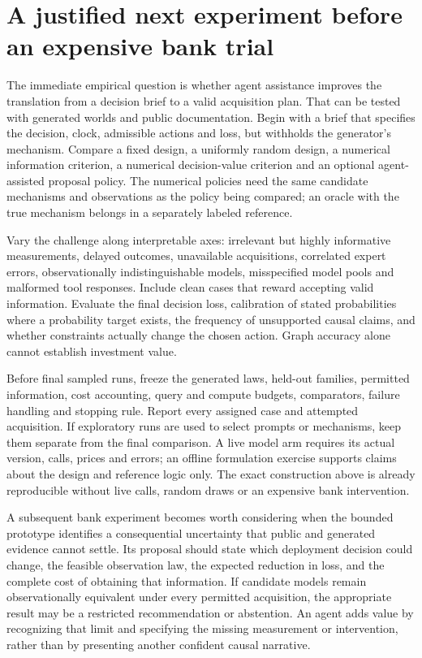 \section{A justified next experiment before an expensive bank trial}

The immediate empirical question is whether agent assistance improves the
translation from a decision brief to a valid acquisition plan. That can be
tested with generated worlds and public documentation. Begin with a brief
that specifies the decision, clock, admissible actions and loss, but withholds
the generator's mechanism. Compare a fixed design, a uniformly random design,
a numerical information criterion, a numerical decision-value criterion and
an optional agent-assisted proposal policy. The numerical policies need the
same candidate mechanisms and observations as the policy being compared; an
oracle with the true mechanism belongs in a separately labeled reference.

Vary the challenge along interpretable axes: irrelevant but highly informative
measurements, delayed outcomes, unavailable acquisitions, correlated expert
errors, observationally indistinguishable models, misspecified model pools
and malformed tool responses. Include clean cases that reward accepting
valid information. Evaluate the final decision loss, calibration of stated
probabilities where a probability target exists, the frequency of unsupported
causal claims, and whether constraints actually change the chosen action.
Graph accuracy alone cannot establish investment value.

Before final sampled runs, freeze the generated laws, held-out families,
permitted information, cost accounting, query and compute budgets, comparators,
failure handling and stopping rule. Report every assigned case and attempted
acquisition. If exploratory runs are used to select prompts or mechanisms,
keep them separate from the final comparison. A live model arm requires its
actual version, calls, prices and errors; an offline formulation exercise
supports claims about the design and reference logic only. The exact
construction above is already reproducible without live calls, random draws
or an expensive bank intervention.

A subsequent bank experiment becomes worth considering when the bounded
prototype identifies a consequential uncertainty that public and generated
evidence cannot settle. Its proposal should state which deployment decision
could change, the feasible observation law, the expected reduction in loss,
and the complete cost of obtaining that information. If candidate models
remain observationally equivalent under every permitted acquisition, the
appropriate result may be a restricted recommendation or abstention. An
agent adds value by recognizing that limit and specifying the missing
measurement or intervention, rather than by presenting another confident
causal narrative.
\label{exec13:active-experiments-end}
